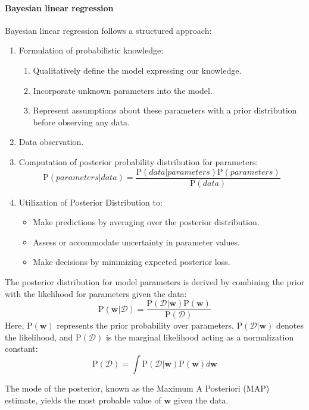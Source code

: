 \paragraph*{Bayesian linear regression}
Bayesian linear regression follows a structured approach:
\begin{enumerate}
    \item Formulation of probabilistic knowledge:
        \begin{enumerate}
            \item Qualitatively define the model expressing our knowledge.
            \item Incorporate unknown parameters into the model.
            \item Represent assumptions about these parameters with a prior distribution before observing any data.
        \end{enumerate}
    \item Data observation.
    \item Computation of posterior probability distribution for parameters:
        \[\text{P}(parameters|data)=\dfrac{\text{P}(data|parameters)\text{P}(parameters)}{\text{P}(data)}\]
    \item Utilization of Posterior Distribution to:
        \begin{itemize}
            \item Make predictions by averaging over the posterior distribution.
            \item Assess or accommodate uncertainty in parameter values.
            \item Make decisions by minimizing expected posterior loss.
        \end{itemize}
\end{enumerate}

The posterior distribution for model parameters is derived by combining the prior with the likelihood for parameters given the data:
\[\text{P}(\textbf{w}|\mathcal{D})=\dfrac{\text{P}(\mathcal{D}|\textbf{w})\text{P}(\textbf{w})}{\text{P}(\mathcal{D})}\]
Here, $\text{P}(\textbf{w})$ represents the prior probability over parameters, $\text{P}(\mathcal{D}|\textbf{w})$ denotes the likelihood, and $\text{P}(\mathcal{D})$ is the marginal likelihood acting as a normalization constant: 
\[\text{P}(\mathcal{D})=\int\text{P}(\mathcal{D}|\textbf{w})\text{P}(\textbf{w})d\textbf{w}\] 

The mode of the posterior, known as the Maximum A Posteriori (MAP) estimate, yields the most probable value of $\textbf{w}$ given the data.

